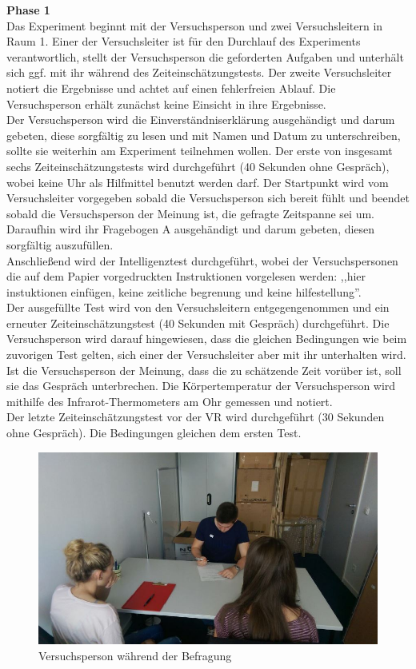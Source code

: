 \documentclass{Bericht}
\begin{document}
\textbf{Phase 1}\\
Das Experiment beginnt mit der Versuchsperson und zwei Versuchsleitern in Raum 1. Einer der Versuchsleiter ist für den Durchlauf des Experiments verantwortlich, stellt der Versuchsperson die geforderten Aufgaben und unterhält sich ggf. mit ihr während des Zeiteinschätzungstests. Der zweite Versuchsleiter notiert die Ergebnisse und achtet auf einen fehlerfreien Ablauf. Die Versuchsperson erhält zunächst keine Einsicht in ihre Ergebnisse.\\
Der Versuchsperson wird die Einverständniserklärung ausgehändigt und darum gebeten, diese sorgfältig zu lesen und mit Namen und Datum zu unterschreiben, sollte sie weiterhin am Experiment teilnehmen wollen.
Der erste von insgesamt sechs Zeiteinschätzungstests wird durchgeführt (40 Sekunden ohne Gespräch), wobei keine Uhr als Hilfmittel benutzt werden darf.
Der Startpunkt wird vom Versuchsleiter vorgegeben sobald die Versuchsperson sich bereit fühlt und beendet sobald die Versuchsperson der Meinung ist, die gefragte Zeitspanne sei um.\\
Daraufhin wird ihr Fragebogen A ausgehändigt und darum gebeten, diesen sorgfältig auszufüllen.\\
Anschließend wird der Intelligenztest durchgeführt, wobei der Versuchspersonen die auf dem Papier vorgedruckten Instruktionen vorgelesen werden: 
,,hier instuktionen einfügen, keine zeitliche begrenung und keine hilfestellung''.\\
Der ausgefüllte Test wird von den Versuchsleitern entgegengenommen und ein erneuter Zeiteinschätzungstest  (40 Sekunden mit Gespräch) durchgeführt. Die Versuchsperson wird darauf hingewiesen, dass die gleichen Bedingungen wie beim zuvorigen Test gelten, sich einer der Versuchsleiter aber mit ihr unterhalten wird. Ist die Versuchsperson der Meinung, dass die zu schätzende Zeit vorüber ist, soll sie das Gespräch unterbrechen. Die Körpertemperatur der Versuchsperson wird mithilfe des Infrarot-Thermometers am Ohr gemessen und notiert.\\
Der letzte Zeiteinschätzungstest vor der VR wird durchgeführt (30 Sekunden ohne Gespräch). Die Bedingungen gleichen dem ersten Test.

\begin{figure}[H]
	\centering    
	\includegraphics[height=\textheight, width=\linewidth, keepaspectratio]{../Bilder/t.jpg}
	\caption{Versuchsperson während der Befragung}
	\label{img:befragung}
\end{figure}
\end{document}
